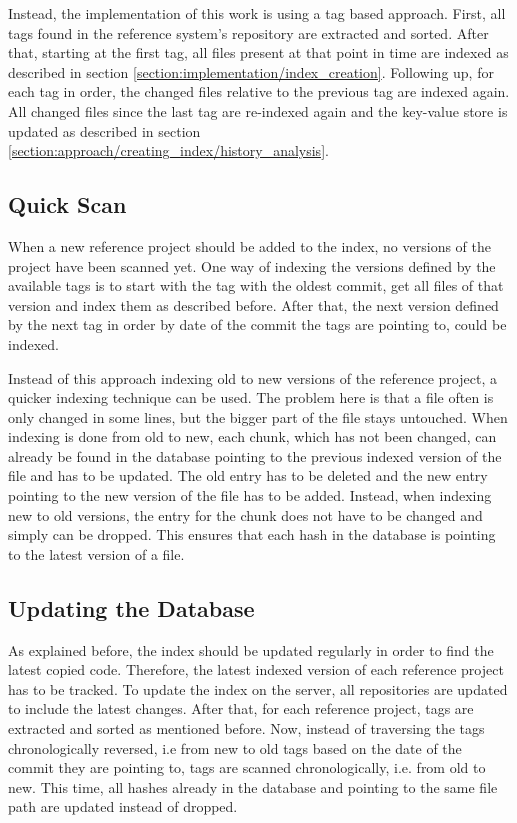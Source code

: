 Instead, the implementation of this work is using a tag based approach.
First, all tags found in the reference system's repository are extracted and sorted.
After that, starting at the first tag, all files present at that point in time are indexed as described in section \ref{section:implementation/index_creation}.
Following up, for each tag in order, the changed files relative to the previous tag are indexed again.
All changed files since the last tag are re-indexed again and the key-value store is updated as described in section \ref{section:approach/creating_index/history_analysis}.

\subsection{Quick Scan}\label{section:implementation/history_analysis/quick_scan}
When a new reference project should be added to the index, no versions of the project have been scanned yet.
One way of indexing the versions defined by the available tags is to start with the tag with the oldest commit, get all files of that version and index them as described before.
After that, the next version defined by the next tag in order by date of the commit the tags are pointing to, could be indexed.

Instead of this approach indexing old to new versions of the reference project, a quicker indexing technique can be used.
The problem here is that a file often is only changed in some lines, but the bigger part of the file stays untouched.
When indexing is done from old to new, each chunk, which has not been changed, can already be found in the database pointing to the previous indexed version of the file and has to be updated.
The old entry has to be deleted and the new entry pointing to the new version of the file has to be added.
Instead, when indexing new to old versions, the entry for the chunk does not have to be changed and simply can be dropped.
This ensures that each hash in the database is pointing to the latest version of a file.

\subsection{Updating the Database}\label{section:implementation/history_analysis/update}
As explained before, the index should be updated regularly in order to find the latest copied code.
Therefore, the latest indexed version of each reference project has to be tracked.
To update the index on the server, all repositories are updated to include the latest changes.
After that, for each reference project, tags are extracted and sorted as mentioned before.
Now, instead of traversing the tags chronologically reversed, i.e from new to old tags based on the date of the commit they are pointing to, tags are scanned chronologically, i.e. from old to new.
This time, all hashes already in the database and pointing to the same file path are updated instead of dropped.

